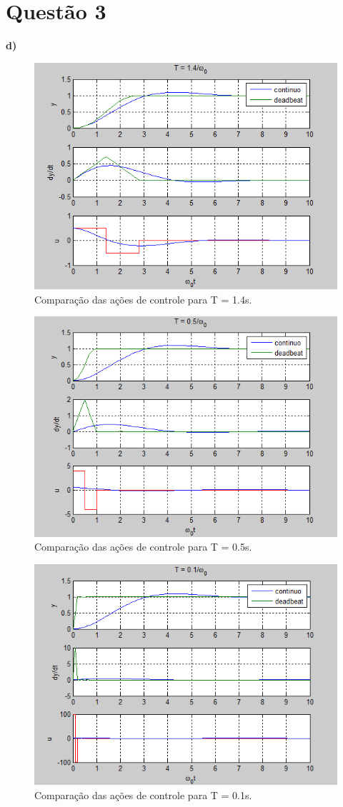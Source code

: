 \documentclass{article}
\begin{document}
\section*{Questão 3}
    {\textbf{d)}}
    \begin{figure}[H]
       \centering
            \includegraphics[width=.7\linewidth]{images/sim_t14s.png}
            \caption{Comparação das ações de controle para T = 1.4s.}
            \label{fig:sim1_4}
    \end{figure}
    \begin{figure}[H]
       \centering
            \includegraphics[width=.7\linewidth]{images/sim_t05s.png}
            \caption{Comparação das ações de controle para T = 0.5s.}
            \label{fig:sim0_5}
    \end{figure}
    \begin{figure}[H]
       \centering
            \includegraphics[width=.7\linewidth]{images/sim_t01s.png}
            \caption{Comparação das ações de controle para T = 0.1s.}
            \label{fig:sim0_1}
    \end{figure}
\end{document}
